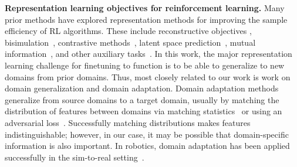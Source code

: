 \textbf{Representation learning objectives for reinforcement learning.}
Many prior methods have explored representation methods for improving the sample efficiency of RL algorithms. These include reconstructive objectives \cite{lange2010deep, lange2012autonomous, finn2016deep}, bisimulation~\cite{ferns2004bisimulation, castro20bisimulation, zhang2021dbc}, contrastive methods~\cite{laskin2020curl, nguyen2021tpc}, latent space prediction~\cite{schwarzer2020spr}, mutual information~{}, and other auxiliary tasks~\cite{jonschkowski2017pve, ghosh2018learning, sax2018midlevel}.
In this work, the major representation learning challenge for finetuning to function is to be able to generalize to new domains from prior domains.
Thus, most closely related to our work is work on domain generalization and domain adaptation. Domain adaptation methods generalize from source domains to a target domain, usually by matching the distribution of features between domains via matching statistics~\cite{tzeng2014domainconfusion, sun2016coral, long2015adaptation} or using an adversarial loss~\cite{ganin2016domainadversarial, Bousmalis2016}.
Successfully matching distributions makes features indistinguishable; however, in our case, it may be possible that domain-specific information is also important.
In robotics, domain adaptation has been applied successfully in the sim-to-real setting~\cite{bousmalis2017simtoreal, james218simtosim}.

